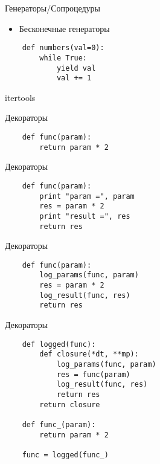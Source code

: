 \documentclass{article}
\begin{document}
\begin{center} Генераторы/Сопроцедуры \end{center}
\begin{itemize}
    \item Бесконечные генераторы
\end{itemize}
\vspace{15pt}
\begin{lstlisting}
    def numbers(val=0):
        while True:
            yield val
            val += 1
\end{lstlisting}
\newpage

\begin{center} itertools \end{center}
\newpage

\begin{center} Декораторы \end{center}
\begin{lstlisting}
    def func(param):
        return param * 2

\end{lstlisting}
\newpage

\begin{center} Декораторы \end{center}
\begin{lstlisting}
    def func(param):
        print "param =", param
        res = param * 2
        print "result =", res
        return res
\end{lstlisting}
\newpage

\begin{center} Декораторы \end{center}
\begin{lstlisting}
    def func(param):
        log_params(func, param)
        res = param * 2
        log_result(func, res)
        return res
\end{lstlisting}
\newpage

\begin{center} Декораторы \end{center}
\begin{lstlisting}
    def logged(func):
        def closure(*dt, **mp):
            log_params(func, param)
            res = func(param)
            log_result(func, res)
            return res
        return closure

    def func_(param):
        return param * 2

    func = logged(func_)
\end{lstlisting}
\newpage
\end{document}
